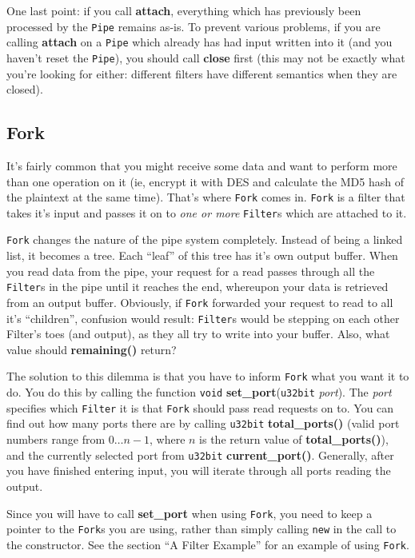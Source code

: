 \documentclass{article}
\newcommand{\function}[1]{\textbf{#1}}
\newcommand{\type}[1]{\texttt{#1}}
\renewcommand{\arg}[1]{\textsl{#1}}
\begin{document}
One last point: if you call \function{attach}, everything which has previously
been processed by the \type{Pipe} remains as-is. To prevent various problems,
if you are calling \function{attach} on a \type{Pipe} which already has had
input written into it (and you haven't reset the \type{Pipe}), you should call
\function{close} first (this may not be exactly what you're looking for either:
different filters have different semantics when they are closed).

\subsection{Fork}

It's fairly common that you might receive some data and want to perform more
than one operation on it (ie, encrypt it with DES and calculate the MD5 hash of
the plaintext at the same time). That's where \type{Fork} comes in. \type{Fork}
is a filter that takes it's input and passes it on to \emph{one or more}
\type{Filter}s which are attached to it.

\type{Fork} changes the nature of the pipe system completely. Instead of being
a linked list, it becomes a tree. Each ``leaf'' of this tree has it's own
output buffer. When you read data from the pipe, your request for a read passes
through all the \type{Filter}s in the pipe until it reaches the end, whereupon
your data is retrieved from an output buffer. Obviously, if \type{Fork}
forwarded your request to read to all it's ``children'', confusion would
result: \type{Filter}s would be stepping on each other Filter's toes (and
output), as they all try to write into your buffer. Also, what value should
\function{remaining()} return?

The solution to this dilemma is that you have to inform \type{Fork} what you
want it to do. You do this by calling the function \type{void}
\function{set\_port}(\type{u32bit} \arg{port}). The \arg{port} specifies which
\type{Filter} it is that \type{Fork} should pass read requests on to.  You can
find out how many ports there are by calling \type{u32bit}
\function{total\_ports()} (valid port numbers range from $0 \ldots n - 1$,
where $n$ is the return value of \function{total\_ports()}), and the currently
selected port from \type{u32bit} \function{current\_port()}. Generally, after
you have finished entering input, you will iterate through all ports reading
the output.

Since you will have to call \function{set\_port} when using \type{Fork}, you
need to keep a pointer to the \type{Fork}s you are using, rather than simply
calling \verb|new| in the call to the constructor. See the section ``A Filter
Example'' for an example of using \type{Fork}.
\end{document}
